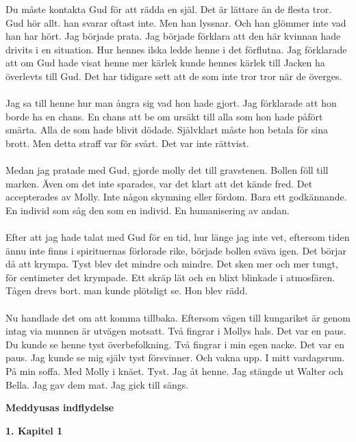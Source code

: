 \documentclass[]{article}
\begin{document}
Du måste kontakta Gud för att rädda en själ. Det är lättare än de flesta tror. Gud hör allt. han svarar oftast inte. Men han lyssnar. Och han glömmer inte vad han har hört. Jag började prata. Jag började förklara att den här kvinnan hade drivits i en situation. Hur hennes ilska ledde henne i det förflutna. Jag förklarade att om Gud hade visat henne mer kärlek kunde hennes kärlek till Jacken ha överlevts till Gud. Det har tidigare sett att de som inte tror tror när de överges.
\\ \\
Jag sa till henne hur man ångra sig vad hon hade gjort. Jag förklarade att hon borde ha en chans. En chans att be om ursäkt till alla som hon hade påfört smärta. Alla de som hade blivit dödade. Självklart måste hon betala för sina brott. Men detta straff var för svårt. Det var inte rättvist. 
\\ \\
Medan jag pratade med Gud, gjorde molly det till gravstenen. Bollen föll till marken. Även om det inte sparades, var det klart att det kände fred. Det accepterades av Molly. Inte någon skymning eller fördom. Bara ett godkännande. En individ som såg den som en individ. En humanisering av andan.
\\ \\
Efter att jag hade talat med Gud för en tid, hur länge jag inte vet, eftersom tiden ännu inte finns i spirituernas förlorade rike, började bollen sväva igen. Det börjar då att krympa. Tyst blev det mindre och mindre. Det sken mer och mer tungt, för centimeter det krympade. Ett skräp lät och en blixt blinkade i atmosfären. Tågen drevs bort. man kunde plötsligt se. Hon blev rädd.
\\ \\
Nu handlade det om att komma tillbaka. Eftersom vägen till kungariket är genom intag via munnen är utvägen motsatt. Två fingrar i Mollys hals. Det var en paus. Du kunde se henne tyst överbefolkning. Två fingrar i min egen nacke. Det var en paus. Jag kunde se mig själv tyst försvinner. Och vakna upp. I mitt vardagsrum. På min soffa. Med Molly i knäet. Tyst. Jag åt henne. Jag stängde ut Walter och Bella. Jag gav dem mat. Jag gick till sängs.

\newpage

\begin{center}
	\Large\textbf{Meddyusas indflydelse}
\end{center}

\begin{center}
	\large\textbf{1. Kapitel 1}
\end{center}
\end{document}
